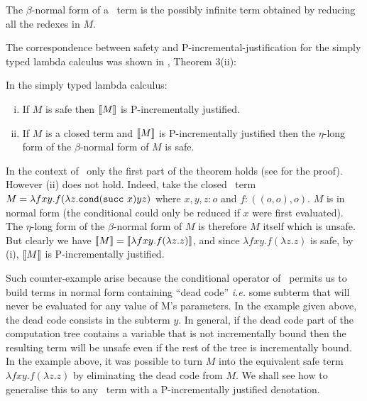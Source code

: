 The $\beta$-normal form of a \pcf\ term is the possibly infinite term obtained by reducing all the redexes in $M$.



The correspondence between safety and P-incremental-justification for the simply typed lambda calculus was shown
in \cite{blumong:safelambdacalculus}, Theorem 3(ii):

\begin{theorem}
\label{thm:safeincrejust} In the simply typed lambda calculus:
\begin{enumerate}[(i)]
\item If $M$ is safe then ${[\![ M ]\!]}$ is P-incrementally justified.
\item If $M$ is a closed term and ${[\![ M ]\!]}$ is
  P-incrementally justified then the $\eta$-long form of the
  $\beta$-normal form of $M$ is safe.
\end{enumerate}
\end{theorem}

In the context of \pcf\, only the first part of the theorem holds (see \cite{blumtransfer} for the proof). However (ii) does not hold. Indeed, take the closed \pcf\ term $M = \lambda f x y. f (\lambda z. \texttt{cond} (\texttt{succ}\ x) y z )$ where $x,y,z:o$ and $f:((o,o),o)$. $M$ is in normal form (the conditional  could  only be reduced if $x$ were first evaluated). The $\eta$-long form of the $\beta$-normal form of $M$ is therefore $M$ itself which is unsafe.
But clearly we have ${[\![ M ]\!]} = {[\![ \lambda f x y. f (\lambda z. z) ]\!]}$, and since  $\lambda f x y. f (\lambda z. z)$ is safe, by (i), ${[\![ M ]\!]}$ is P-incrementally justified.

Such counter-example arise because the conditional operator of \pcf\ permits us to build terms in normal form containing ``dead code'' {\it i.e.} some  subterm that will never be evaluated for any value of M's parameters. In the example given above, the dead code consists in the subterm $y$. In general, if the dead code part of the computation tree contains a variable that is not incrementally bound then the resulting term will be unsafe even if the rest of the tree is incrementally bound.
In the example above, it was possible to turn $M$ into the equivalent safe term $\lambda f x y. f (\lambda z. z)$ by eliminating the dead code from $M$.
We shall see how to generalise this to any \pcf\ term with a P-incrementally justified denotation.

